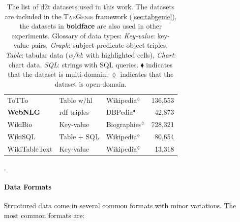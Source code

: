 {\begin{table}[t]
\begin{tabular}{@{}lllr@{}}
        ToTTo \cite{parikhToTToControlledTableToText2020}                                          & Table w/hl           & Wikipedia$^\lozenge$    & 136,553         \\
        \textbf{WebNLG} \cite{gardentWebNLGChallengeGenerating2017}                                & \ac{rdf} triples     & DBPedia$^\blacklozenge$ & 42,873          \\
        WikiBio \cite{lebretNeuralTextGeneration2016}                                              & Key-value            & Biographies$^\lozenge$  & 728,321         \\
        WikiSQL \cite{zhong2017seq2sql}                                                            & Table + SQL          & Wikipedia$^\lozenge$    & 80,654          \\
        WikiTableText \cite{bao2018table}                                                          & Key-value            & Wikipedia$^\lozenge$    & 13,318          \\
        \bottomrule
    \end{tabular}
    \caption{The list of \ac{d2t} datasets used in this work. The datasets are included in the \textsc{TabGenie} framework (\autoref{sec:tabgenie}), the datasets in \textbf{boldface} are also used in other experiments. Glossary of data types: \textit{Key-value}: key-value pairs, \textit{Graph}: subject-predicate-object triples, \textit{Table}: tabular data (\textit{w/hl}: with highlighted cells), \textit{Chart}: chart data, \textit{SQL}: strings with SQL queries. $\blacklozenge$ indicates that the dataset is multi-domain; $\lozenge$ indicates that the dataset is open-domain.}
    \label{tab:datasets}.
\end{table}

\paragraph{Data Formats} Structured data come in several common formats with minor variations. The most common formats are:

}
